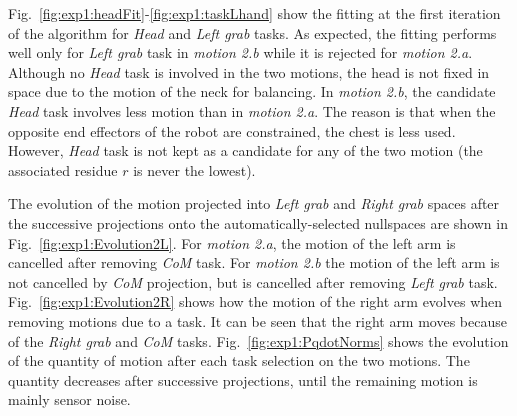 \documentclass[journal]{IEEEtran}
\begin{document}
Fig.~\ref{fig:exp1:headFit}-\ref{fig:exp1:taskLhand} show the
fitting at the first iteration of the algorithm for \emph{Head} and \emph{Left grab} tasks. As expected,
the fitting performs well only for \emph{Left grab} task in \emph{motion 2.b} while it is rejected for
\emph{motion 2.a}.
Although no \emph{Head} task is involved in the two motions, the head is not
fixed in space due to the motion of the neck for balancing.
In \emph{motion 2.b}, the candidate \emph{Head} task involves less motion
than in \emph{motion 2.a}. The reason is that when the opposite end effectors
of the robot are constrained, the chest is less used.
However, \emph{Head} task is not kept as a candidate for any of the two motion (the associated residue $r$ is never the lowest).

The evolution of the motion projected into \emph{Left grab} and \emph{Right grab}
spaces after the successive projections onto the automatically-selected nullspaces
are shown in Fig.~\ref{fig:exp1:Evolution2L}. For \emph{motion 2.a},
the motion of the left arm is cancelled after removing \emph{CoM} task.
For \emph{motion 2.b} the motion of the left arm is
not cancelled by \emph{CoM} projection, but is cancelled after
removing \emph{Left grab} task.
Fig.~\ref{fig:exp1:Evolution2R} shows how the motion of the right arm evolves when removing
motions due to a task. It can be seen that the right arm moves because of the \emph{Right grab} and
\emph{CoM} tasks.
Fig.~\ref{fig:exp1:PqdotNorms} shows the evolution of the quantity of motion after each task selection
on the two motions. The quantity decreases after successive projections, until the remaining motion
is mainly sensor noise.
\end{document}
